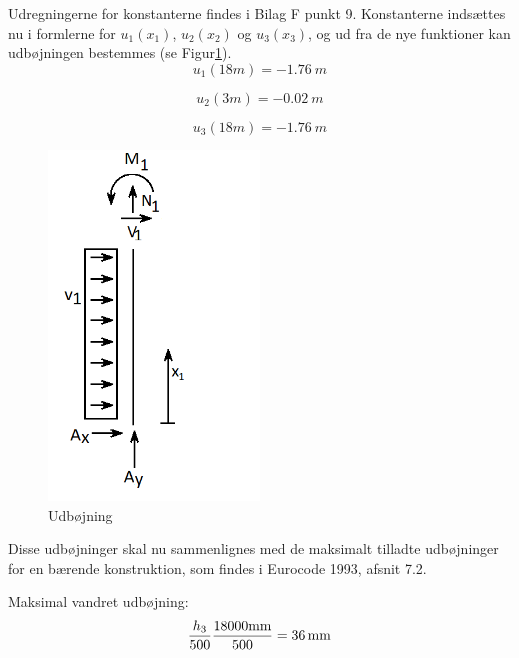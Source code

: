 Udregningerne for konstanterne findes i Bilag F punkt 9.
\newline
\newline 
Konstanterne indsættes nu i formlerne for $u_1(x_1)$, $u_2(x_2)$ og $u_3(x_3)$, og ud fra de nye funktioner kan udbøjningen bestemmes (se Figur\ref{fig:udboj}).
\begin{equation}
u_1(18m) = \SI{-1,76}{m}
\end{equation}

\begin{equation}
u_2(3m) = \SI{-0,02}{m}
\end{equation}

\begin{equation}
u_3(18m) = \SI{-1,76}{m}
\end{equation}

\begin{figure}[H]
	\centering
	\includegraphics[width=0.5\textwidth]{billeder/asnitet.png}
	\caption{Udbøjning}
	\label{fig:udboj}
\end{figure}

Disse udbøjninger skal nu sammenlignes med de maksimalt tilladte udbøjninger for en bærende konstruktion, som findes i Eurocode 1993, afsnit 7.2. 

Maksimal vandret udbøjning: 
\begin{equation}
\frac{h_3}{500}
\\
\frac{18000 \text{mm}}{500} = \SI{36}{mm}
\end{equation}

